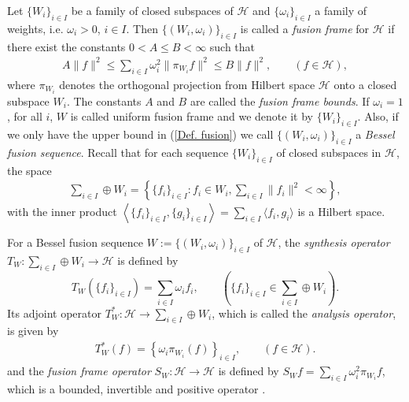 \documentclass{birkjour}
\theoremstyle{definition}
\theoremstyle{remark}
\numberwithin{equation}{section}
\begin{document}
 Let $\{W_i\}_{i\in I}$ be a family of closed subspaces of $\mathcal{H}$ and $\{\omega_i\}_{i\in I}$ a family of
weights, i.e. $\omega_i>0$, $i\in I$. Then $\{(W_i,\omega_i)\}_{i\in
I}$ is called a \textit{fusion frame} for $\mathcal{H}$ if there exist the
constants $0<A\leq B<\infty$ such that
\begin{eqnarray}\label{Def. fusion}
A\|f\|^{2}\leq \sum_{i\in I}\omega_i^2\|\pi_{W_i}f\|^2\leq
B\|f\|^{2},\qquad (f\in \mathcal{H}),
\end{eqnarray}
where $\pi_{W_{i}}$ denotes the orthogonal projection from Hilbert space $\mathcal{H}$ onto a closed subspace $W_{i}$. The constants $A$ and $B$ are called the \textit{fusion frame
bounds}. If $\omega_i=1$, for all $i$, $W$ is called uniform fusion frame and we denote it by $\lbrace
W_{i}\rbrace_{i\in I}$. Also, if we only have the upper bound in (\ref{Def. fusion}) we
call $\{(W_i,\omega_i)\}_{i\in I}$ a \textit{Bessel fusion
sequence}. 
Recall that for each sequence $\{W_i\}_{i\in I}$ of closed subspaces
in $\mathcal{H}$, the space
\begin{eqnarray*}
\sum_{i\in I}\oplus W_{i} =\left\{\{f_i\}_{i\in I}:f_i\in W_i,
\sum_{i\in I}\|f_i\|^2<\infty\right\},
\end{eqnarray*}
 with the inner product $\left\langle \{f_i\}_{i\in I},\{g_i\}_{i\in I} \right\rangle=\sum_{i\in
I}\langle f_i,g_i \rangle$ is a Hilbert space.


For a Bessel fusion sequence $W := \{(W_i,\omega_i)\}_{i\in I}$ of
$\mathcal{H}$, the \textit{synthesis operator} $T_{W}: \sum_{i\in
I}\oplus W_{i} \rightarrow\mathcal{H}$ is defined by
\begin{equation*}
T_{W}\left(\{f_i\}_{i\in I}\right)=\sum_{i\in I}\omega_if_i,\qquad
\left(\{f_{i}\}_{i\in I}\in \sum_{i\in I}\oplus W_{i}\right).
\end{equation*}
Its adjoint operator $T_{W}^{*}: \mathcal{H}\rightarrow \sum_{i\in
I}\oplus W_{i}$, which is called the \textit{analysis
operator}, is given by
\begin{eqnarray*}
T_{W}^{*}(f)=\left\{\omega_{i}\pi_{W_{i}}(f)\right\}_{i\in I},\qquad (f\in
\mathcal{H}).\end{eqnarray*}
and the \textit{fusion frame operator}
$S_{W}:\mathcal{H}\rightarrow\mathcal{H}$ is defined by $S_{W
}f=\sum_{i\in I}\omega_i^{2}\pi_{W_i}f$, which is a bounded,
invertible and positive operator \cite{Cas04}.
\end{document}
